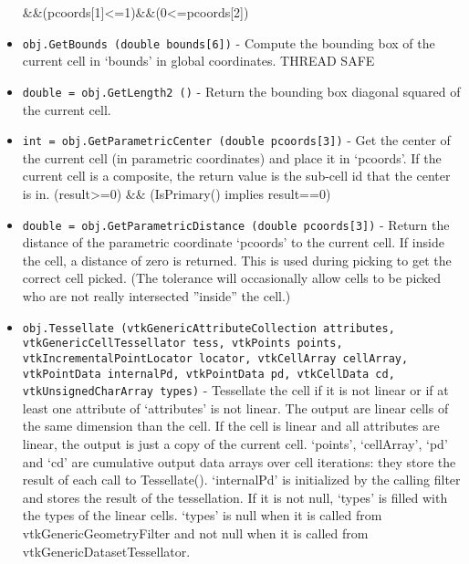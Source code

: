 \begin{itemize}
 
 \&\&(pcoords[1]<=1)\&\&(0<=pcoords[2])%
 
 
 

\item  \verb|obj.GetBounds (double bounds[6])| -  Compute the bounding box of the current cell in `bounds' in global
 coordinates.
 THREAD SAFE

\item  \verb|double = obj.GetLength2 ()| -  Return the bounding box diagonal squared of the current cell.
 

\item  \verb|int = obj.GetParametricCenter (double pcoords[3])| -  Get the center of the current cell (in parametric coordinates) and place
 it in `pcoords'.  If the current cell is a composite, the return value
 is the sub-cell id that the center is in.  
 (result>=0) \&\& (IsPrimary() implies result==0)

\item  \verb|double = obj.GetParametricDistance (double pcoords[3])| -  Return the distance of the parametric coordinate `pcoords' to the
 current cell.  If inside the cell, a distance of zero is returned. This
 is used during picking to get the correct cell picked. (The tolerance
 will occasionally allow cells to be picked who are not really
 intersected ''inside'' the cell.)  

\item  \verb|obj.Tessellate (vtkGenericAttributeCollection attributes, vtkGenericCellTessellator tess, vtkPoints points, vtkIncrementalPointLocator locator, vtkCellArray cellArray, vtkPointData internalPd, vtkPointData pd, vtkCellData cd, vtkUnsignedCharArray types)| -  Tessellate the cell if it is not linear or if at least one attribute of
 `attributes' is not linear. The output are linear cells of the same
 dimension than the cell. If the cell is linear and all attributes are
 linear, the output is just a copy of the current cell.
 `points', `cellArray', `pd' and `cd' are cumulative output data arrays
 over cell iterations: they store the result of each call to Tessellate().
 `internalPd' is initialized by the calling filter and stores the
 result of the tessellation.
 If it is not null, `types' is filled with the types of the linear cells.
 `types' is null when it is called from vtkGenericGeometryFilter and not
 null when it is called from vtkGenericDatasetTessellator.
 
 
 
 
 
 
 


\end{itemize}
